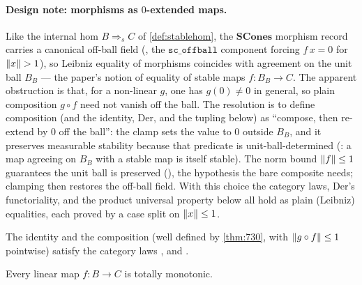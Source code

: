 \paragraph{Design note: morphisms as \texorpdfstring{$0$}{0}-extended maps.}
Like the internal hom $B \mathbin{\Rightarrow_s} C$ of
\autoref{def:stablehom}, the $\mathbf{SCones}$ morphism record carries a
canonical off-ball field
(, the
$\texttt{sc\_offball}$ component forcing $f\,x = 0$ for $\lVert x \rVert > 1$),
so Leibniz equality of morphisms coincides with agreement on the unit
ball $B_B$ --- the paper's notion of equality of stable maps
$f : B_B \to C$. The apparent obstruction is that, for a non-linear $g$,
one has $g(0) \neq 0$ in general, so plain composition $g \circ f$ need
not vanish off the ball. The resolution is to define composition (and
the identity, $\mathrm{Der}$, and the tupling below) as ``compose, then
re-extend by $0$ off the ball'': the clamp
 sets the value to $0$ outside
$B_B$, and it preserves measurable stability because that predicate is
unit-ball-determined
(: a map agreeing
on $B_B$ with a stable map is itself stable). The norm bound
$\lVert f \rVert \leq 1$ guarantees the unit ball is preserved
(), the hypothesis the bare
composite needs; clamping then restores the off-ball field. With this
choice the category laws, $\mathrm{Der}$'s functoriality, and the
product universal property below all hold as plain (Leibniz) equalities,
each proved by a case split on $\lVert x \rVert \leq 1$.

\begin{theorem}
\label{thm:scones-cat}
\rocqok{}
The identity  and the
composition  (well defined by
\autoref{thm:730}, with $\lVert g \circ f \rVert \leq 1$ pointwise) satisfy
the category laws ,
 and
.
\end{theorem}

\begin{lemma}
\label{lem:linear-totmono}
\rocqok{}
Every linear map $f : B \to C$ is totally monotonic.
\end{lemma}


